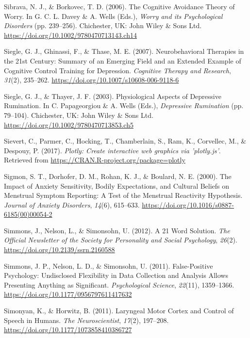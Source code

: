\documentclass[a4paper,12pt,twoside,openright,oldfontcommands,final]{memoir}
\begin{document}
\leavevmode\hypertarget{ref-davey_cognitive_2006}{}%
Sibrava, N. J., \& Borkovec, T. D. (2006). The Cognitive Avoidance Theory of Worry. In G. C. L. Davey \& A. Wells (Eds.), \emph{Worry and its Psychological Disorders} (pp. 239--256). Chichester, UK: John Wiley \& Sons Ltd. \url{https://doi.org/10.1002/9780470713143.ch14}

\leavevmode\hypertarget{ref-siegle_neurobehavioral_2007}{}%
Siegle, G. J., Ghinassi, F., \& Thase, M. E. (2007). Neurobehavioral Therapies in the 21st Century: Summary of an Emerging Field and an Extended Example of Cognitive Control Training for Depression. \emph{Cognitive Therapy and Research}, \emph{31}(2), 235--262. \url{https://doi.org/10.1007/s10608-006-9118-6}

\leavevmode\hypertarget{ref-papageorgiou_physiological_2003}{}%
Siegle, G. J., \& Thayer, J. F. (2003). Physiological Aspects of Depressive Rumination. In C. Papageorgiou \& A. Wells (Eds.), \emph{Depressive Rumination} (pp. 79--104). Chichester, UK: John Wiley \& Sons Ltd. \url{https://doi.org/10.1002/9780470713853.ch5}

\leavevmode\hypertarget{ref-R-plotly}{}%
Sievert, C., Parmer, C., Hocking, T., Chamberlain, S., Ram, K., Corvellec, M., \& Despouy, P. (2017). \emph{Plotly: Create interactive web graphics via 'plotly.js'}. Retrieved from \url{https://CRAN.R-project.org/package=plotly}

\leavevmode\hypertarget{ref-sigmon_impact_2000}{}%
Sigmon, S. T., Dorhofer, D. M., Rohan, K. J., \& Boulard, N. E. (2000). The Impact of Anxiety Sensitivity, Bodily Expectations, and Cultural Beliefs on Menstrual Symptom Reporting: A Test of the Menstrual Reactivity Hypothesis. \emph{Journal of Anxiety Disorders}, \emph{14}(6), 615--633. \url{https://doi.org/10.1016/s0887-6185(00)00054-2}

\leavevmode\hypertarget{ref-simmons_21_2012}{}%
Simmons, J., Nelson, L., \& Simonsohn, U. (2012). A 21 Word Solution. \emph{The Official Newsletter of the Society for Personality and Social Psychology}, \emph{26}(2). \url{https://doi.org/10.2139/ssrn.2160588}

\leavevmode\hypertarget{ref-simmons_false-positive_2011}{}%
Simmons, J. P., Nelson, L. D., \& Simonsohn, U. (2011). False-Positive Psychology: Undisclosed Flexibility in Data Collection and Analysis Allows Presenting Anything as Significant. \emph{Psychological Science}, \emph{22}(11), 1359--1366. \url{https://doi.org/10.1177/0956797611417632}

\leavevmode\hypertarget{ref-simonyan_laryngeal_2011}{}%
Simonyan, K., \& Horwitz, B. (2011). Laryngeal Motor Cortex and Control of Speech in Humans. \emph{The Neuroscientist}, \emph{17}(2), 197--208. \url{https://doi.org/10.1177/1073858410386727}
\end{document}
